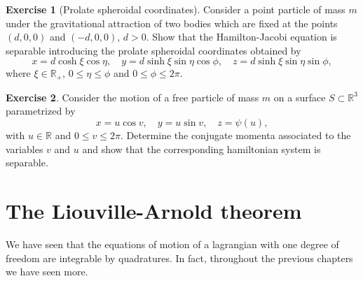 \documentclass[english,fontsize=11pt,paper=b5]{scrbook}
\theoremstyle{definition}
\newtheorem{exercise}{Exercise}[chapter]
\begin{document}
      \begin{exercise}[Prolate spheroidal coordinates]
        Consider a point particle of mass $m$ under the gravitational attraction of two bodies which are fixed at the points $(d,0,0)$ and $(-d,0,0)$, $d>0$.
        Show that the Hamilton-Jacobi equation is separable introducing the prolate spheroidal coordinates obtained by
        \begin{equation}
          x = d \cosh\xi \cos\eta, \quad
          y = d \sinh\xi \sin\eta \cos\phi, \quad
          z = d \sinh\xi \sin\eta \sin\phi,
        \end{equation}
        where $\xi\in\mathbb{R}_+$, $0\leq\eta\leq\phi$ and $0\leq\phi\leq 2\pi$.
      \end{exercise}

      \begin{exercise}
        Consider the motion of a free particle of mass $m$ on a surface $S\subset\mathbb{R}^3$ parametrized by
        \begin{equation}
          x = u \cos v, \quad
          y = u \sin v, \quad
          z = \psi(u),
        \end{equation}
        with $u\in\mathbb{R}$ and $0\leq v\leq 2\pi$.
        Determine the conjugate momenta associated to the variables $v$ and $u$ and show that the corresponding hamiltonian system is separable.
      \end{exercise}

      \section{The Liouville-Arnold theorem}\label{sec:intsys}

      We have seen that the equations of motion of a lagrangian with one degree of freedom are integrable by quadratures.
      In fact, throughout the previous chapters we have seen more.
\end{document}
